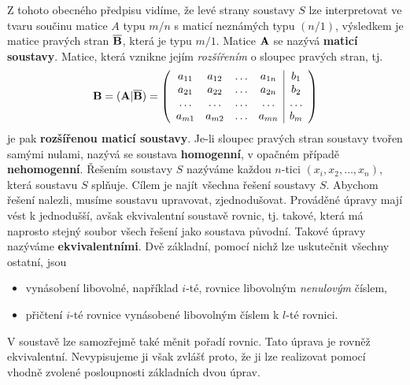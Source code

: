     Z tohoto obecného předpisu vidíme, že levé strany soustavy \(S\) lze interpretovat ve tvaru 
    součinu matice \(A\) typu \(m/n\) s maticí neznámých typu \((n/1)\), výsledkem je matice 
    pravých stran \(\overline{\mathbf{B}}\), která je typu \(m/1\). Matice \(\mathbf{A}\) se nazývá 
    \textbf{maticí soustavy}. Matice, která vznikne jejím \emph{rozšířením} o sloupec pravých 
    stran, tj.
    \begin{equation}\label{mai:eq006}
      \mathbf{B} = (\mathbf{A}|\overline{\mathbf{B}}) =
      \left(
        \begin{array}{cccc|c}
          a_{11} & a_{12} & \ldots & a_{1n} & b_1    \\
          a_{21} & a_{22} & \ldots & a_{2n} & b_2    \\
          \ldots & \ldots & \ldots & \ldots & \ldots \\
          a_{m1} & a_{m2} & \ldots & a_{mn} & b_m
        \end{array}
      \right)
    \end{equation}
    je pak \textbf{rozšířenou maticí soustavy}. Je-li sloupec pravých stran soustavy tvořen 
    samými nulami, nazývá se soustava \textbf{homogenní}, v opačném případě \textbf{nehomogenní}. 
    Řešením soustavy \(S\) nazýváme každou \(n\)-tici \((x_i, x_2,\ldots, x_n)\), která soustavu 
    \(S\) splňuje. Cílem je najít všechna řešení soustavy \(S\). Abychom řešení nalezli, musíme 
    soustavu upravovat, zjednodušovat. Prováděné úpravy mají vést k jednodušší, avšak 
    ekvivalentní soustavě rovnic, tj. takové, která má naprosto stejný soubor všech řešení jako 
    soustava původní. Takové úpravy nazýváme \textbf{ekvivalentními}. Dvě základní, pomocí nichž 
    lze uskutečnit všechny ostatní, jsou
    \begin{itemize}\addtolength{\itemsep}{-0.5\baselineskip}
      \item vynásobení libovolné, například \(i\)-té, rovnice libovolným \emph{nenulovým} číslem,
      \item přičtení \(i\)-té rovnice vynásobené libovolným číslem k \(l\)-té rovnici.
    \end{itemize} 
    V soustavě lze samozřejmě také měnit pořadí rovnic. Tato úprava je rovněž ekvivalentní. 
    Nevypisujeme ji však zvlášť proto, že ji lze realizovat pomocí vhodně zvolené posloupnosti 
    základních dvou úprav.
    
